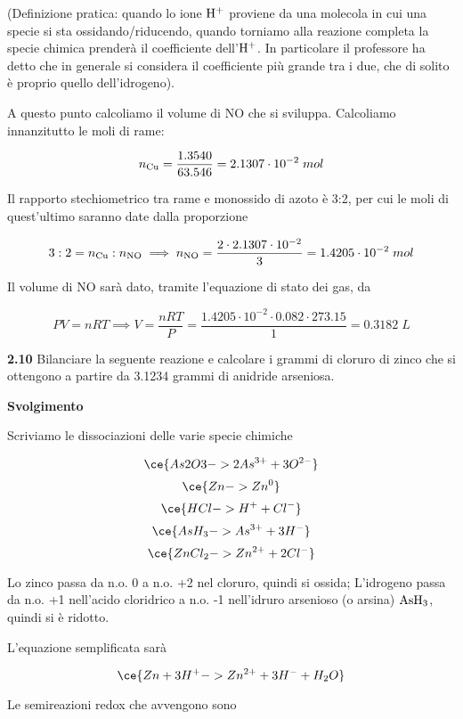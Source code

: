 (Definizione pratica: quando lo ione $\rm H^+$ proviene da una molecola in cui una specie si sta ossidando/riducendo, quando torniamo alla reazione completa la specie chimica prenderà il coefficiente dell'$\rm H^+$. In particolare il professore ha detto che in generale si considera il coefficiente più grande tra i due, che di solito è proprio quello dell'idrogeno).

\vspace{0.2cm}A questo punto calcoliamo il volume di NO che si sviluppa. Calcoliamo innanzitutto le moli di rame:

$$n_{\rm Cu}=\frac{1.3540}{63.546}=2.1307 \cdot 10^{-2}\;mol$$

Il rapporto stechiometrico tra rame e monossido di azoto è 3:2, per cui le moli di quest'ultimo saranno date dalla proporzione

$$3:2=n_{\rm Cu}:n_{\rm NO}
\implies
n_{\rm NO}=\frac{2 \cdot 2.1307 \cdot 10^{-2}}{3}=1.4205 \cdot 10^{-2}\;mol$$

Il volume di NO sarà dato, tramite l'equazione di stato dei gas, da

$$PV=nRT
\implies
V=\frac{nRT}{P}=\frac{1.4205 \cdot 10^{-2} \cdot 0.082 \cdot 273.15}{1}=0.3182\;L$$

\newpage

\vspace{0.2cm}\textbf{2.10} Bilanciare la seguente reazione e calcolare i grammi di cloruro di zinco che si ottengono a partire da 3.1234 grammi di anidride arseniosa.

\begin{center}
\end{center}

\large\textbf{Svolgimento}\normalsize

\vspace{0.2cm}Scriviamo le dissociazioni delle varie specie chimiche

$$\ce{As2O3 -> 2As^{3+} + 3O^{2-}}$$
$$\ce{Zn -> Zn^0}$$
$$\ce{HCl -> H^+ + Cl^-}$$
$$\ce{AsH_3 -> As^{3+} + 3H^{-}}$$
$$\ce{ZnCl_2 -> Zn^{2+} + 2Cl^{-}}$$

Lo zinco passa da n.o. 0 a n.o. +2 nel cloruro, quindi si ossida; L'idrogeno passa da n.o. +1 nell'acido cloridrico a n.o. -1 nell'idruro arsenioso (o arsina) $\rm AsH_3$, quindi si è ridotto.

L'equazione semplificata sarà

$$\ce{Zn + 3H^+ -> Zn^{2+} + 3H^- + H_2O }$$

Le semireazioni redox che avvengono sono

